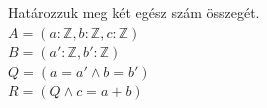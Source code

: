 \documentclass[a4paper,12pt]{article}
\newcommand{\lv}{{:}}
\begin{document}
	\author{Zsolt Borsi}	
\bigskip
\bigskip

Határozzuk meg két egész szám összegét.\\
$A = (a\lv\mathbb{Z}, b\lv\mathbb{Z}, c\lv\mathbb{Z})$\\[2pt]
$B = (a'\lv\mathbb{Z}, b'\lv\mathbb{Z})$\\[2pt]
$Q = (a = a' \land b = b')$\\[2pt]
$R = (Q \land c = a + b)$
\end{document}
